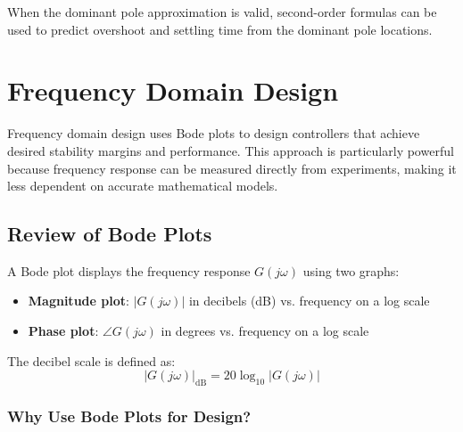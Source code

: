 When the dominant pole approximation is valid, second-order formulas can be used to predict overshoot and settling time from the dominant pole locations.


\section{Frequency Domain Design}
\label{sec:frequency_domain}

Frequency domain design uses Bode plots to design controllers that achieve desired stability margins and performance. This approach is particularly powerful because frequency response can be measured directly from experiments, making it less dependent on accurate mathematical models.

\subsection{Review of Bode Plots}
\label{subsec:bode_review}

A Bode plot displays the frequency response $G(j\omega)$ using two graphs:
\begin{itemize}
    \item \textbf{Magnitude plot}: $|G(j\omega)|$ in decibels (dB) vs. frequency on a log scale
    \item \textbf{Phase plot}: $\angle G(j\omega)$ in degrees vs. frequency on a log scale
\end{itemize}

The decibel scale is defined as:
\begin{equation}
|G(j\omega)|_{\text{dB}} = 20 \log_{10} |G(j\omega)|
\end{equation}

\subsubsection{Why Use Bode Plots for Design?}

